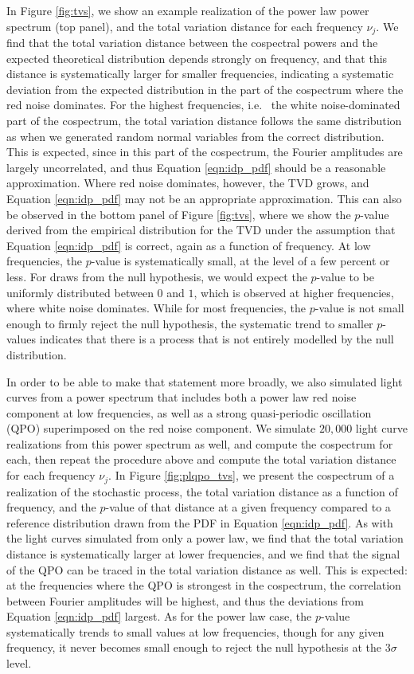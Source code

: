 \documentclass[fleqn,usenatbib]{mnras}
\begin{document}
In Figure \ref{fig:tvs}, we show an example realization of the power law power spectrum (top panel), and the total variation distance for each frequency $\nu_j$. We find that the total variation distance between the cospectral powers and the expected theoretical distribution depends strongly on frequency, and that this distance is systematically larger for smaller frequencies, indicating a systematic deviation from the expected distribution in the part of the cospectrum where the red noise dominates. For the highest frequencies, i.e.~ the white noise-dominated part of the cospectrum, the total variation distance follows the same distribution as when we generated random normal variables from the correct distribution. This is expected, since in this part of the cospectrum, the Fourier amplitudes are largely uncorrelated, and thus Equation \ref{eqn:idp_pdf} should be a reasonable approximation. Where red noise dominates, however, the TVD grows, and Equation \ref{eqn:idp_pdf} may not be an appropriate approximation. This can also be observed in the bottom panel of Figure \ref{fig:tvs}, where we show the $p$-value derived from the empirical distribution for the TVD under the assumption that Equation \ref{eqn:idp_pdf} is correct, again as a function of frequency. At low frequencies, the $p$-value is systematically small, at the level of a few percent or less. For draws from the null hypothesis, we would expect the $p$-value to be uniformly distributed between $0$ and $1$, which is observed at higher frequencies, where white noise dominates. While for most frequencies, the $p$-value is not small enough to firmly reject the null hypothesis, the systematic trend to smaller $p$-values indicates that there is a process that is not entirely modelled by the null distribution.

In order to be able to make that statement more broadly, we also simulated light curves from a power spectrum that includes both a power law red noise component at low frequencies, as well as a strong quasi-periodic oscillation (QPO) superimposed on the red noise component. We simulate $20,000$ light curve realizations from this power spectrum as well, and compute the cospectrum for each, then repeat the procedure above and compute the total variation distance for each frequency $\nu_j$. In Figure \ref{fig:plqpo_tvs}, we present the cospectrum of  a realization of the stochastic process, the total variation distance as a function of frequency, and the $p$-value of that distance at a given frequency compared to a reference distribution drawn from the PDF in Equation \ref{eqn:idp_pdf}. As with the light curves simulated from only a power law, we find that the total variation distance is systematically larger at lower frequencies, and we find that the signal of the QPO can be traced in the total variation distance as well. This is expected: at the frequencies where the QPO is strongest in the cospectrum, the correlation between Fourier amplitudes will be highest, and thus the deviations from Equation \ref{eqn:idp_pdf} largest. As for the power law case, the $p$-value systematically trends to small values at low frequencies, though for any given frequency, it never becomes small enough to reject the null hypothesis at the $3\sigma$ level. 
\end{document}
